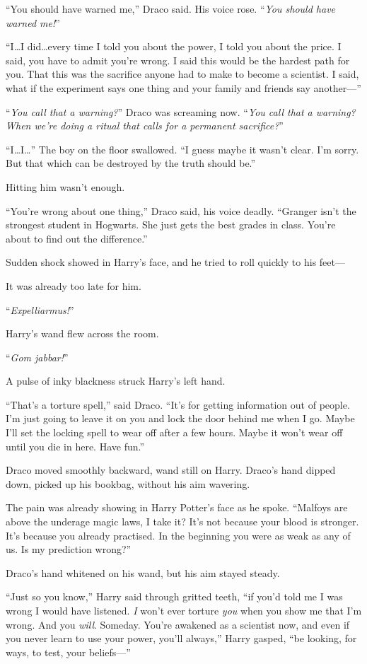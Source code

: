 “You should have warned me,” Draco said. His voice rose. “\emph{You should have
warned me!}”

“I…I did…every time I told you about the power, I told you
about the price. I said, you have to admit you’re wrong. I said this would be
the hardest path for you. That this was the sacrifice anyone had to make to
become a scientist. I said, what if the experiment says one thing and your
family and friends say another—”

“\emph{You call that a warning?}” Draco was screaming now. “\emph{You call that
a warning? When we’re doing a ritual that calls for a permanent sacrifice?}”

“I…I…” The boy on the floor swallowed. “I guess maybe it wasn’t
clear. I’m sorry. But that which can be destroyed by the truth should be.”

Hitting him wasn’t enough.

“You’re wrong about one thing,” Draco said, his voice deadly. “Granger isn’t
the strongest student in Hogwarts. She just gets the best grades in class.
You’re about to find out the difference.”

Sudden shock showed in Harry’s face, and he tried to roll quickly to his feet—

It was already too late for him.

“\emph{Expelliarmus!}”

Harry’s wand flew across the room.

“\emph{Gom jabbar!}”

A pulse of inky blackness struck Harry’s left hand.

“That’s a torture spell,” said Draco. “It’s for getting information out of
people. I’m just going to leave it on you and lock the door behind me when I
go. Maybe I’ll set the locking spell to wear off after a few hours. Maybe it
won’t wear off until you die in here. Have fun.”

Draco moved smoothly backward, wand still on Harry. Draco’s hand dipped down,
picked up his bookbag, without his aim wavering.

The pain was already showing in Harry Potter’s face as he spoke. “Malfoys are
above the underage magic laws, I take it? It’s not because your blood is
stronger. It’s because you already practised. In the beginning you were as weak
as any of us. Is my prediction wrong?”

Draco’s hand whitened on his wand, but his aim stayed steady.

“Just so you know,” Harry said through gritted teeth, “if you’d told me I was
wrong I would have listened. \emph{I} won’t ever torture \emph{you} when you
show me that I’m wrong. And you \emph{will}. Someday. You’re awakened as a
scientist now, and even if you never learn to use your power, you’ll always,”
Harry gasped, “be looking, for ways, to test, your beliefs—”

